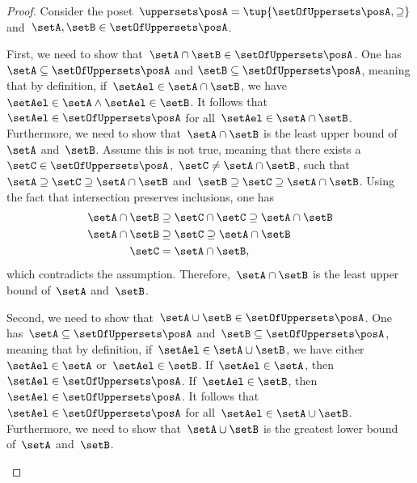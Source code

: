 \begin{proof}
    Consider the poset~$\uppersets \posA=\tup{\setOfUppersets \posA,\supseteq}$ and~$\setA,\setB\in \setOfUppersets \posA$.
    \begin{compactitem}
        \item First, we need to show that~$\setA\cap \setB\in \setOfUppersets \posA$.
              One has~$\setA \subseteq \setOfUppersets \posA$ and $\setB\subseteq \setOfUppersets \posA$, meaning that by definition, if~$\setAel\in \setA\cap \setB$, we have~$\setAel \in \setA \wedge \setAel \in \setB$.
              It follows that~$\setAel \in \setOfUppersets \posA$ for all~$\setAel \in \setA\cap \setB$.
              Furthermore, we need to show that~$\setA\cap \setB$ is the least upper bound of~$\setA$ and~$\setB$.
              Assume this is not true, meaning that there exists a~$\setC\in \setOfUppersets \posA$,~$\setC\neq \setA\cap \setB$, such that~$\setA\supseteq \setC\supseteq \setA\cap \setB$ and~$\setB\supseteq \setC\supseteq \setA\cap \setB$.
              Using the fact that intersection preserves inclusions, one has
              \begin{equation}
                  \begin{aligned}
                      \setA\cap \setB & \supseteq \setC\cap \setC \supseteq \setA\cap \setB \\
                      \setA\cap \setB & \supseteq \setC \supseteq \setA\cap \setB           \\
                      \setC           & = \setA\cap \setB,
                  \end{aligned}
              \end{equation}
              which contradicts the assumption.
              Therefore,~$\setA\cap \setB$ is the least upper bound of~$\setA$ and~$\setB$.
        \item Second, we need to show that~$\setA\cup \setB\in \setOfUppersets \posA$.
              One has~$\setA\subseteq \setOfUppersets \posA$ and~$\setB\subseteq \setOfUppersets \posA$, meaning that by definition, if~$\setAel\in \setA\cup \setB$, we have either~$\setAel\in \setA$ or~$\setAel\in \setB$.
              If~$\setAel\in \setA$, then~$\setAel\in \setOfUppersets \posA$.
              If~$\setAel\in \setB$, then~$\setAel \in \setOfUppersets \posA$.
              It follows that~$\setAel \in \setOfUppersets \posA$ for all~$\setAel\in \setA\cup \setB$.
              Furthermore, we need to show that~$\setA\cup \setB$ is the greatest lower bound of~$\setA$ and~$\setB$.

\end{compactitem}
\end{proof}
